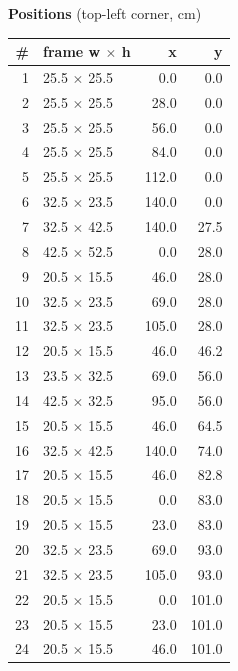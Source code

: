 \documentclass[a4paper,landscape,10pt]{article}
\begin{document}
\begin{minipage}[t]{0.25\textwidth}
\vspace{8pt}
{\bfseries Positions} (top-left corner, cm)\\[2pt]
\tiny
\begin{tabular}{@{}r l r r@{}}
\toprule
\# & frame w $\times$ h & x & y \\
\midrule
1 & 25.5 $\times$ 25.5 & 0.0 & 0.0 \\
2 & 25.5 $\times$ 25.5 & 28.0 & 0.0 \\
3 & 25.5 $\times$ 25.5 & 56.0 & 0.0 \\
4 & 25.5 $\times$ 25.5 & 84.0 & 0.0 \\
5 & 25.5 $\times$ 25.5 & 112.0 & 0.0 \\
6 & 32.5 $\times$ 23.5 & 140.0 & 0.0 \\
7 & 32.5 $\times$ 42.5 & 140.0 & 27.5 \\
8 & 42.5 $\times$ 52.5 & 0.0 & 28.0 \\
9 & 20.5 $\times$ 15.5 & 46.0 & 28.0 \\
10 & 32.5 $\times$ 23.5 & 69.0 & 28.0 \\
11 & 32.5 $\times$ 23.5 & 105.0 & 28.0 \\
12 & 20.5 $\times$ 15.5 & 46.0 & 46.2 \\
13 & 23.5 $\times$ 32.5 & 69.0 & 56.0 \\
14 & 42.5 $\times$ 32.5 & 95.0 & 56.0 \\
15 & 20.5 $\times$ 15.5 & 46.0 & 64.5 \\
16 & 32.5 $\times$ 42.5 & 140.0 & 74.0 \\
17 & 20.5 $\times$ 15.5 & 46.0 & 82.8 \\
18 & 20.5 $\times$ 15.5 & 0.0 & 83.0 \\
19 & 20.5 $\times$ 15.5 & 23.0 & 83.0 \\
20 & 32.5 $\times$ 23.5 & 69.0 & 93.0 \\
21 & 32.5 $\times$ 23.5 & 105.0 & 93.0 \\
22 & 20.5 $\times$ 15.5 & 0.0 & 101.0 \\
23 & 20.5 $\times$ 15.5 & 23.0 & 101.0 \\
24 & 20.5 $\times$ 15.5 & 46.0 & 101.0 \\
\bottomrule
\end{tabular}
\end{minipage}
\clearpage
\end{document}
